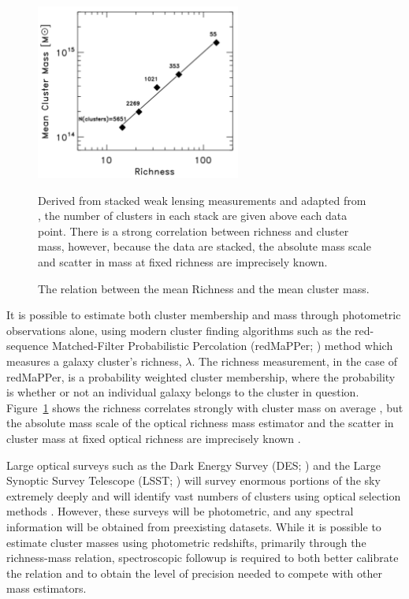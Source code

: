 \begin{figure}[t]
	\begin{center}
		\includegraphics[width=0.6\textwidth]{figures/massrichness.pdf}
	\end{center}
	\caption{The relation between the mean Richness and the mean cluster mass.} 
	Derived from stacked weak lensing measurements and adapted from \citealt{Rozo2010}, the number of clusters in each stack are given above each data point. There is a strong correlation between richness and cluster mass, however, because the data are stacked, the absolute mass scale and scatter in mass at fixed richness are imprecisely known.
	\label{fig:massrichness}
\end{figure}

It is possible to estimate both cluster membership and mass through photometric observations alone, using modern cluster finding algorithms such as the red-sequence Matched-Filter Probabilistic Percolation (redMaPPer; \citealt{Rykoff2014}) method which measures a galaxy cluster's richness, $\lambda$. The richness measurement, in the case of redMaPPer, is a probability weighted cluster membership, where the probability is whether or not an individual galaxy belongs to the cluster in question. Figure~\ref{fig:massrichness} shows the richness correlates strongly with cluster mass on average , but the absolute mass scale of the optical richness mass estimator and the scatter in cluster mass at fixed optical richness are imprecisely known \citep{Rykoff2012}.

Large optical surveys such as the Dark Energy Survey (DES; \citealt{DES2005}) and the Large Synoptic Survey Telescope (LSST; \citealt{LSST2012}) will survey enormous portions of the sky extremely deeply and will identify vast numbers of clusters using optical selection methods . However, these surveys will be photometric, and any spectral information will be obtained from preexisting datasets. While it is possible to estimate cluster masses using photometric redshifts, primarily through the richness-mass relation, spectroscopic followup is required to both better calibrate the relation and to obtain the level of precision needed to compete with other mass estimators. 

